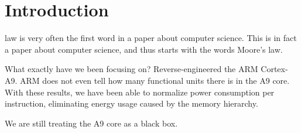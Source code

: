\section{Introduction}

 law is very often the first word in a paper about computer science.
This is in fact a paper about computer science, and thus starts with the words Moore's law.

What exactly have we been focusing on? Reverse-engineered the ARM Cortex-A9. ARM
does not even tell how many functional units there is in the A9 core. With these
results, we have been able to normalize power consumption per instruction,
eliminating energy usage caused by the memory hierarchy.

We are still treating the A9 core as a black box.
